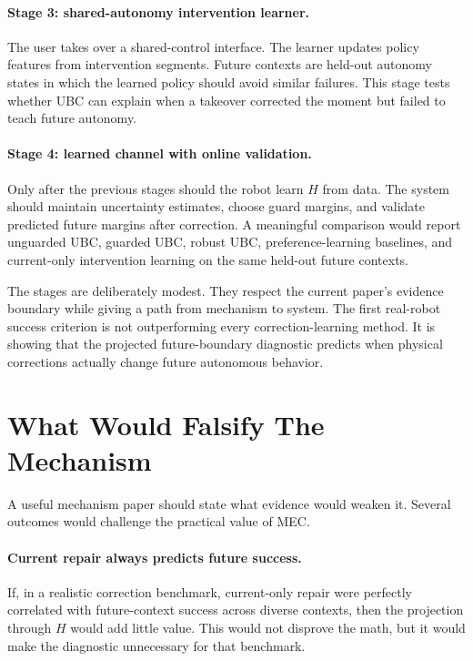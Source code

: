 \documentclass{article}
\begin{document}
\paragraph{Stage 3: shared-autonomy intervention learner.}
The user takes over a shared-control interface. The learner updates policy
features from intervention segments. Future contexts are held-out autonomy
states in which the learned policy should avoid similar failures. This stage
tests whether UBC can explain when a takeover corrected the moment but failed to
teach future autonomy.

\paragraph{Stage 4: learned channel with online validation.}
Only after the previous stages should the robot learn $H$ from data. The system
should maintain uncertainty estimates, choose guard margins, and validate
predicted future margins after correction. A meaningful comparison would report
unguarded UBC, guarded UBC, robust UBC, preference-learning baselines, and
current-only intervention learning on the same held-out future contexts.

The stages are deliberately modest. They respect the current paper's evidence
boundary while giving a path from mechanism to system. The first real-robot
success criterion is not outperforming every correction-learning method. It is
showing that the projected future-boundary diagnostic predicts when physical
corrections actually change future autonomous behavior.

\section{What Would Falsify The Mechanism}

A useful mechanism paper should state what evidence would weaken it. Several
outcomes would challenge the practical value of MEC.

\paragraph{Current repair always predicts future success.}
If, in a realistic correction benchmark, current-only repair were perfectly
correlated with future-context success across diverse contexts, then the
projection through $H$ would add little value. This would not disprove the math,
but it would make the diagnostic unnecessary for that benchmark.
\end{document}
